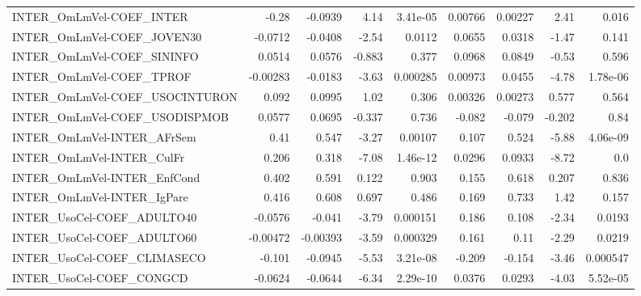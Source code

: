 \begin{tabular}{lrrrrrrrr}
INTER\_OmLmVel-COEF\_INTER              &       -0.28 &      -0.0939 &    4.14 & 3.41e-05 &    0.00766 &     0.00227 &         2.41 &         0.016 \\
INTER\_OmLmVel-COEF\_JOVEN30            &     -0.0712 &      -0.0408 &   -2.54 &   0.0112 &     0.0655 &      0.0318 &        -1.47 &         0.141 \\
INTER\_OmLmVel-COEF\_SININFO            &      0.0514 &       0.0576 &  -0.883 &    0.377 &     0.0968 &      0.0849 &        -0.53 &         0.596 \\
INTER\_OmLmVel-COEF\_TPROF              &    -0.00283 &      -0.0183 &   -3.63 & 0.000285 &    0.00973 &      0.0455 &        -4.78 &      1.78e-06 \\
INTER\_OmLmVel-COEF\_USOCINTURON        &       0.092 &       0.0995 &    1.02 &    0.306 &    0.00326 &     0.00273 &        0.577 &         0.564 \\
INTER\_OmLmVel-COEF\_USODISPMOB         &      0.0577 &       0.0695 &  -0.337 &    0.736 &     -0.082 &      -0.079 &       -0.202 &          0.84 \\
INTER\_OmLmVel-INTER\_AFrSem            &        0.41 &        0.547 &   -3.27 &  0.00107 &      0.107 &       0.524 &        -5.88 &      4.06e-09 \\
INTER\_OmLmVel-INTER\_CulFr             &       0.206 &        0.318 &   -7.08 & 1.46e-12 &     0.0296 &      0.0933 &        -8.72 &           0.0 \\
INTER\_OmLmVel-INTER\_EnfCond           &       0.402 &        0.591 &   0.122 &    0.903 &      0.155 &       0.618 &        0.207 &         0.836 \\
INTER\_OmLmVel-INTER\_IgPare            &       0.416 &        0.608 &   0.697 &    0.486 &      0.169 &       0.733 &         1.42 &         0.157 \\
INTER\_UsoCel-COEF\_ADULTO40            &     -0.0576 &       -0.041 &   -3.79 & 0.000151 &      0.186 &       0.108 &        -2.34 &        0.0193 \\
INTER\_UsoCel-COEF\_ADULTO60            &    -0.00472 &     -0.00393 &   -3.59 & 0.000329 &      0.161 &        0.11 &        -2.29 &        0.0219 \\
INTER\_UsoCel-COEF\_CLIMASECO           &      -0.101 &      -0.0945 &   -5.53 & 3.21e-08 &     -0.209 &      -0.154 &        -3.46 &      0.000547 \\
INTER\_UsoCel-COEF\_CONGCD              &     -0.0624 &      -0.0644 &   -6.34 & 2.29e-10 &     0.0376 &      0.0293 &        -4.03 &      5.52e-05 \\

\end{tabular}
